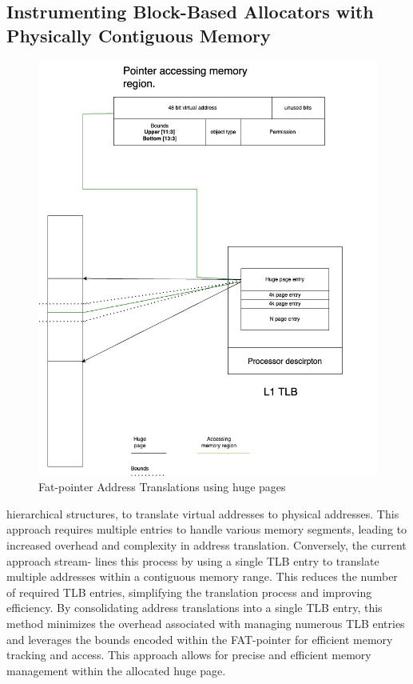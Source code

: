 \documentclass[11pt]{article}
\begin{document}
\subsection{Instrumenting Block-Based Allocators with Physically Contiguous Memory}
\label{sec:org52e34a5}
\begin{figure}[htbp]
\centering
\includegraphics[width=.9\linewidth]{diagram/TLBAccess.drawio.png}
\caption{\label{fig:org5c993a2}Fat-pointer Address Translations using huge pages}
\end{figure}

hierarchical structures, to translate virtual addresses to physical addresses. This approach requires multiple entries to handle various
memory segments, leading to increased overhead and complexity
in address translation. Conversely, the current approach stream-
lines this process by using a single TLB entry to translate multiple
addresses within a contiguous memory range. This reduces the
number of required TLB entries, simplifying the translation process
and improving efficiency. By consolidating address translations into
a single TLB entry, this method minimizes the overhead associated
with managing numerous TLB entries and leverages the bounds
encoded within the FAT-pointer for efficient memory tracking and
access. This approach allows for precise and efficient memory management within the allocated huge page.
\end{document}
